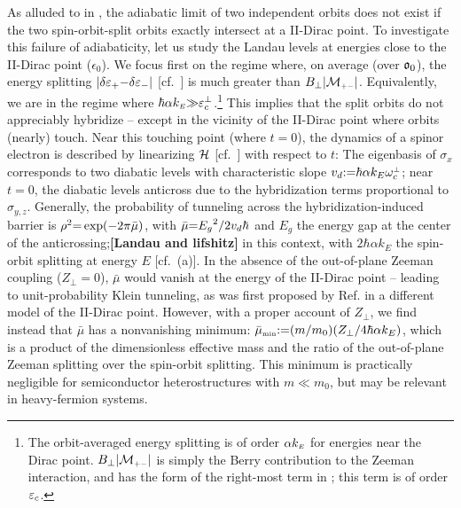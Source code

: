 \documentclass[aps, prb, showpacs, twocolumn, notitlepage, superscriptaddress]{revtex4-1}
\begin{document}
As alluded to in , the adiabatic limit of two independent orbits does not exist if the two spin-orbit-split orbits exactly intersect at a II-Dirac point. To investigate this failure of adiabaticity, let us study the Landau levels at energies close to the II-Dirac point ($\epsilon_0$). We focus first on the regime where, on average (over $\mathfrak{o}_0$), the energy splitting $|\delta \varepsilon_+{-}\delta \varepsilon_-|$ [cf.\ ] is much greater than $B_\perp|{\cal M}_{\scriptscriptstyle{+-}}|$. Equivalently, we are in the regime where $\hbar\alpha k_{\scriptscriptstyle{E}}{\gg}\varepsilon_c^\perp$.\footnote{The orbit-averaged energy splitting is of order $\alpha k_{\scriptscriptstyle{E}}$ for energies near the Dirac point. $B_\perp|{\cal M}_{\scriptscriptstyle{+-}}|$ is simply the Berry contribution to the Zeeman interaction, and has the form of the right-most term in ; this term is of order $\varepsilon_c$.} This implies that the split orbits do not appreciably hybridize -- except in the vicinity of the II-Dirac point where orbits (nearly) touch.  Near this touching point (where $t{=}0$), the dynamics of a spinor electron is described by linearizing $\mathcal{H}$ [cf.\ ] with respect to $t$:
The eigenbasis of $\sigma_x$ corresponds to two diabatic levels with characteristic slope $v_d{:}{=}\hbar\alpha k_E\omega^{\scriptscriptstyle{\perp}}_c$; near $t{=}0$, the diabatic levels anticross  due to the hybridization terms proportional to $\sigma_{y,z}$. Generally, the probability of tunneling across the hybridization-induced barrier is  $\rho^2{=}\exp(-2\pi\bar{\mu})$, with $\bar{\mu}{=}{E_g}^2/{2v_d \hbar}$ and $E_g$ the energy gap at the center of the anticrossing\cite{wittig_landauzener_2005};\textbf{[Landau and lifshitz]} in this context,
with $2\hbar\alpha k_E$ the spin-orbit splitting at energy $E$ [cf.\ (a)]. In the absence of the out-of-plane Zeeman coupling ($Z_\perp{=}0$), $\bar{\mu}$ would vanish at the energy of the II-Dirac point -- leading to unit-probability Klein tunneling, as was first proposed by Ref.  in a different model of the II-Dirac point. However, with a proper account of $Z_\perp$, we find instead that $\bar{\mu}$ has a nonvanishing minimum: $\bar{\mu}_{\scriptscriptstyle{\text{min}}}{:}{=} ( m/m_0)(Z_\perp/4\hbar\alpha k_{E})$, which is a product of the dimensionless effective mass and the ratio of the out-of-plane Zeeman splitting over the spin-orbit splitting. This minimum is practically negligible for  semiconductor heterostructures with $m{\ll}m_0$, but may be relevant in heavy-fermion systems. 
\end{document}
